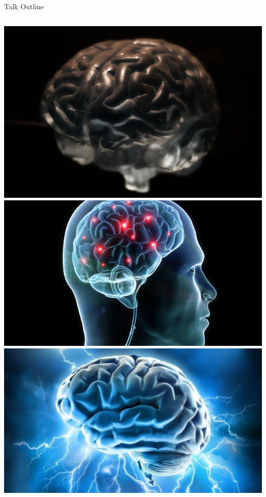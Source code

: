 \documentclass{beamer}
\begin{document}
\begin{frame}{Talk Outline}
\begin{columns}[T,onlytextwidth]
		\includegraphics[width=0.98\columnwidth]{figures/brain1}\\
		\includegraphics[width=0.98\columnwidth]{figures/brain2}\\
		\includegraphics[width=0.98\columnwidth]{figures/brain3}\\

\end{columns}
\end{frame}
\end{document}
